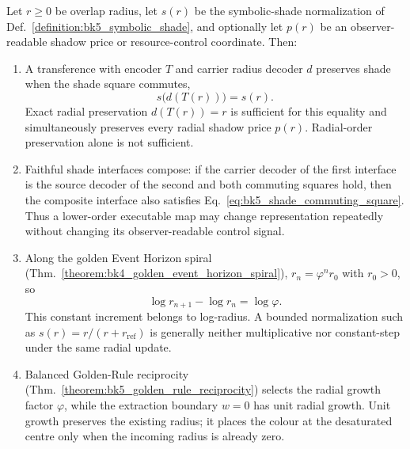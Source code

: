 \begin{proposition}
\label{proposition:bk5_shade_transfers}
Let $r\geq0$ be overlap radius, let $s(r)$ be the symbolic-shade
normalization of Def.~\ref{definition:bk5_symbolic_shade}, and optionally let
$p(r)$ be an observer-readable shadow price or resource-control coordinate.
Then:
\begin{enumerate}
\item A transference with encoder $T$ and carrier radius decoder $d$ preserves
shade when the shade square commutes,
\begin{equation}
 s\bigl(d(T(r))\bigr)=s(r).
 \label{eq:bk5_shade_commuting_square}
\end{equation}
Exact radial preservation $d(T(r))=r$ is sufficient for this equality and
simultaneously preserves every radial shadow price $p(r)$.  Radial-order
preservation alone is not sufficient.
\item Faithful shade interfaces compose: if the carrier decoder of the first
interface is the source decoder of the second and both commuting squares hold,
then the composite interface also satisfies
Eq.~\eqref{eq:bk5_shade_commuting_square}.  Thus a lower-order executable map
may change representation repeatedly without changing its observer-readable
control signal.
\item Along the golden Event Horizon spiral
(Thm.~\ref{theorem:bk4_golden_event_horizon_spiral}),
$r_n=\varphi^n r_0$ with $r_0>0$, so
\begin{equation}
 \log r_{n+1}-\log r_n=\log\varphi.
 \label{eq:bk5_golden_log_radius_step}
\end{equation}
This constant increment belongs to log-radius.  A bounded normalization such
as $s(r)=r/(r+r_{\mathrm{ref}})$ is generally neither multiplicative nor
constant-step under the same radial update.
\item Balanced Golden-Rule reciprocity
(Thm.~\ref{theorem:bk5_golden_rule_reciprocity}) selects the radial growth
factor $\varphi$, while the extraction boundary $w=0$ has unit radial growth.
Unit growth preserves the existing radius; it places the colour at the
desaturated centre only when the incoming radius is already zero.
\end{enumerate}
\end{proposition}

